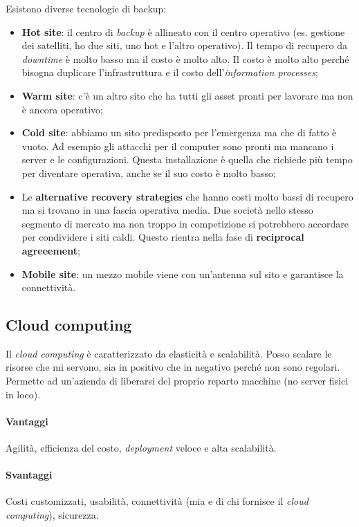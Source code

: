 Esistono diverse tecnologie di backup:
\begin{itemize}
  \item \textbf{Hot site}: il centro di \textit{backup} è allineato con il
  centro operativo (es. gestione dei satelliti, ho due siti, uno hot e l'altro
  operativo). Il tempo di recupero da \textit{downtime} è molto basso ma il
  costo è molto alto. Il costo è molto alto perché bisogna duplicare
  l'infrastruttura e il costo dell'\textit{information processes};
  \item \textbf{Warm site}: c'è un altro sito che ha tutti gli asset pronti
  per lavorare ma non è ancora operativo;
  \item \textbf{Cold site}: abbiamo un sito predisposto per l'emergenza ma che
  di fatto è vuoto. Ad esempio gli attacchi per il computer sono pronti ma
  mancano i server e le configurazioni. Questa installazione è quella che
  richiede più tempo per diventare operativa, anche se il suo costo è molto
  basso;
  \item Le \textbf{alternative recovery strategies} che hanno costi molto bassi
  di recupero ma si trovano in una fascia operativa media. Due società nello
  stesso segmento di mercato ma non troppo in competizione si potrebbero
  accordare per condividere i siti caldi. Questo rientra nella fase di
  \textbf{reciprocal agreeement};
  \item \textbf{Mobile site}: un mezzo mobile viene con un'antenna sul sito e
  garantisce la connettività.
\end{itemize}


\subsection{Cloud computing}

Il \textit{cloud computing} è caratterizzato da elasticità e scalabilità. Posso
scalare le risorse che mi servono, sia in positivo che in negativo perché non
sono regolari. Permette ad un'azienda di liberarsi del proprio reparto macchine
(no server fisici in loco).

\paragraph*{Vantaggi} Agilità, efficienza del costo, \textit{deployment} veloce
e alta scalabilità.

\paragraph*{Svantaggi} Costi customizzati, usabilità, connettività (mia e di
chi fornisce il \textit{cloud computing}), sicurezza.


